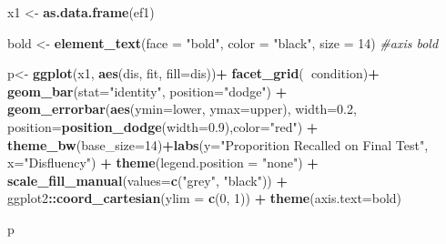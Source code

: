 \documentclass[pdf]{apa6}
\newenvironment{Shaded}{\begin{snugshade}}{\end{snugshade}}
\newcommand{\CommentTok}[1]{\textcolor[rgb]{0.56,0.35,0.01}{\textit{#1}}}
\newcommand{\DataTypeTok}[1]{\textcolor[rgb]{0.13,0.29,0.53}{#1}}
\newcommand{\DecValTok}[1]{\textcolor[rgb]{0.00,0.00,0.81}{#1}}
\newcommand{\FloatTok}[1]{\textcolor[rgb]{0.00,0.00,0.81}{#1}}
\newcommand{\KeywordTok}[1]{\textcolor[rgb]{0.13,0.29,0.53}{\textbf{#1}}}
\newcommand{\NormalTok}[1]{#1}
\newcommand{\OperatorTok}[1]{\textcolor[rgb]{0.81,0.36,0.00}{\textbf{#1}}}
\newcommand{\StringTok}[1]{\textcolor[rgb]{0.31,0.60,0.02}{#1}}
\begin{document}
\begin{Shaded}
\begin{Highlighting}[]
\NormalTok{x1 <-}\StringTok{ }\KeywordTok{as.data.frame}\NormalTok{(ef1)}

\NormalTok{bold <-}\StringTok{ }\KeywordTok{element_text}\NormalTok{(}\DataTypeTok{face =} \StringTok{"bold"}\NormalTok{, }\DataTypeTok{color =} \StringTok{"black"}\NormalTok{, }\DataTypeTok{size =} \DecValTok{14}\NormalTok{) }\CommentTok{#axis bold}

\NormalTok{p<-}\StringTok{ }\KeywordTok{ggplot}\NormalTok{(x1, }\KeywordTok{aes}\NormalTok{(dis, fit, }\DataTypeTok{fill=}\NormalTok{dis))}\OperatorTok{+}\StringTok{ }\KeywordTok{facet_grid}\NormalTok{(}\OperatorTok{~}\NormalTok{condition)}\OperatorTok{+}\StringTok{ }
\StringTok{  }\KeywordTok{geom_bar}\NormalTok{(}\DataTypeTok{stat=}\StringTok{"identity"}\NormalTok{, }\DataTypeTok{position=}\StringTok{"dodge"}\NormalTok{) }\OperatorTok{+}\StringTok{ }
\StringTok{  }\KeywordTok{geom_errorbar}\NormalTok{(}\KeywordTok{aes}\NormalTok{(}\DataTypeTok{ymin=}\NormalTok{lower, }\DataTypeTok{ymax=}\NormalTok{upper), }\DataTypeTok{width=}\FloatTok{0.2}\NormalTok{, }\DataTypeTok{position=}\KeywordTok{position_dodge}\NormalTok{(}\DataTypeTok{width=}\FloatTok{0.9}\NormalTok{),}\DataTypeTok{color=}\StringTok{"red"}\NormalTok{) }\OperatorTok{+}\StringTok{ }\KeywordTok{theme_bw}\NormalTok{(}\DataTypeTok{base_size=}\DecValTok{14}\NormalTok{)}\OperatorTok{+}\KeywordTok{labs}\NormalTok{(}\DataTypeTok{y=}\StringTok{"Proporition Recalled on Final Test"}\NormalTok{, }\DataTypeTok{x=}\StringTok{"Disfluency"}\NormalTok{) }\OperatorTok{+}\StringTok{ }
\StringTok{  }\KeywordTok{theme}\NormalTok{(}\DataTypeTok{legend.position =} \StringTok{"none"}\NormalTok{) }\OperatorTok{+}
\StringTok{  }\KeywordTok{scale_fill_manual}\NormalTok{(}\DataTypeTok{values=}\KeywordTok{c}\NormalTok{(}\StringTok{"grey"}\NormalTok{, }\StringTok{"black"}\NormalTok{)) }\OperatorTok{+}\StringTok{ }\NormalTok{ggplot2}\OperatorTok{::}\KeywordTok{coord_cartesian}\NormalTok{(}\DataTypeTok{ylim =} \KeywordTok{c}\NormalTok{(}\DecValTok{0}\NormalTok{, }\DecValTok{1}\NormalTok{)) }\OperatorTok{+}\StringTok{ }\KeywordTok{theme}\NormalTok{(}\DataTypeTok{axis.text=}\NormalTok{bold)}

\NormalTok{p}
\end{Highlighting}
\end{Shaded}
\end{document}
